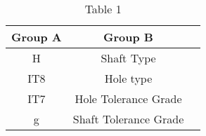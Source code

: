 \begin{table}[h!]
\centering
\caption{Table 1}
\begin{tabular}{|c|c|c|}
\hline
\textbf{Group A} & \textbf{Group B} \\
\hline
H & Shaft Type \\
\hline
IT8 & Hole type \\
\hline
IT7 & Hole Tolerance Grade \\
\hline
g & Shaft Tolerance Grade \\
\hline
\end{tabular}
\label{tab : Table 1}
\end{table}
